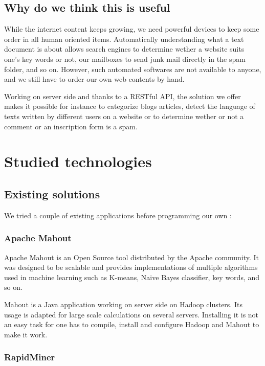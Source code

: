 \documentclass[a4paper,11pt]{article}
\begin{document}
\subsection{Why do we think this is useful}

While the internet content keeps growing, we need powerful devices to keep
some order in all human oriented items. Automatically understanding what a
text document is about allows search engines to determine wether a website
suits one's key words or not, our mailboxes to send junk mail directly in the
spam folder, and so on. However, such automated softwares are not available to
anyone, and we still have to order our own web contents by hand.

Working on server side and thanks to a RESTful API, the solution we offer
makes it possible for instance to categorize blogs articles, detect the
language of texts written by different users on a website or to determine
wether or not a comment or an inscription form is a spam.

\section{Studied technologies}

\subsection{Existing solutions}

We tried a couple of existing applications before programming our own :

\subsubsection{Apache Mahout}

Apache Mahout is an Open Source tool distributed by the Apache community.
It was designed to be scalable and provides implementations of multiple
algorithms used in machine learning such as K-means, Naive Bayes classifier,
key words, and so on.

Mahout is a Java application working on server side on Hadoop clusters. Its
usage is adapted for large scale calculations on several servers. Installing
it is not an easy task for one has to compile, install and configure Hadoop
and Mahout to make it work.


\subsubsection{RapidMiner}
\end{document}
